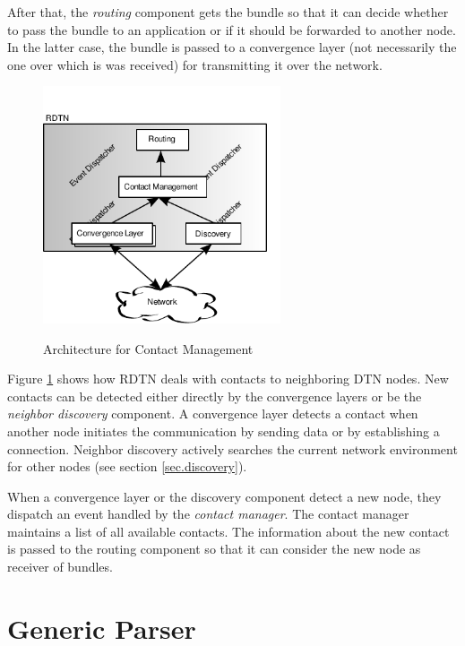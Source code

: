 \documentclass[a4paper]{article}
\begin{document}
After that, the {\em routing} component gets the bundle so
that it can decide whether to pass the bundle to an application or if it should
be forwarded to another node. In the latter case, the bundle is passed to a
convergence layer (not necessarily the one over which is was received) for
transmitting it over the network.\\

\begin{figure}[h]
\begin{center}
\includegraphics[height=7cm]{contact-architecture.pdf}\\
\caption{\label{fig.contact-arch} Architecture for Contact Management}
\end{center}
\end{figure}

Figure \ref{fig.contact-arch} shows how RDTN deals with contacts to neighboring
DTN nodes. New contacts can be detected either directly by the convergence
layers or be the {\em neighbor discovery} component. A convergence layer detects
a contact when another node initiates the communication by sending data or by
establishing a connection.  Neighbor discovery actively searches the current
network environment for other nodes (see section \ref{sec.discovery}).

When a convergence layer or the discovery component detect a new node, they
dispatch an event handled by the {\em contact manager}. The contact manager
maintains a list of all available contacts. The information about the new
contact is passed to the routing component so that it can consider the new node
as receiver of bundles.

\section{Generic Parser}\label{sec.genparser}
\end{document}
